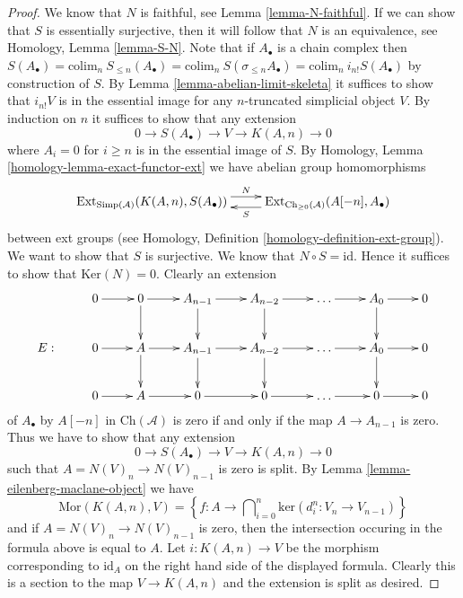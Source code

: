 \begin{proof}
\medskip\noindent
We know that $N$ is faithful, see Lemma \ref{lemma-N-faithful}.
If we can show that $S$ is essentially surjective, then
it will follow that $N$ is an equivalence,
see Homology, Lemma \ref{lemma-S-N}.
Note that if $A_\bullet$ is a chain complex
then $S(A_\bullet) = \text{colim}_n\ S_{\leq n}(A_\bullet)
= \text{colim}_n\ S(\sigma_{\leq n} A_\bullet) =
\text{colim}_n\ i_{n!} S(A_\bullet)$ by construction
of $S$.
By Lemma \ref{lemma-abelian-limit-skeleta} it suffices
to show that $i_{n!} V$ is in the essential image
for any $n$-truncated simplicial object $V$.
By induction on $n$ it suffices to show
that any extension
$$
0 \to S(A_\bullet) \to V \to K(A, n) \to 0
$$
where $A_i = 0$ for $i \geq n$ is in the essential
image of $S$. By Homology, Lemma \ref{homology-lemma-exact-functor-ext}
we have abelian group homomorphisms
$$
\xymatrix{
\text{Ext}_{\text{Simp}(\mathcal{A})}(K(A, n), S(A_\bullet))
\ar@<1ex>[r]^-{N} &
\text{Ext}_{\text{Ch}_{\geq 0}(\mathcal{A})}(A[-n], A_\bullet)
\ar@<1ex>[l]^-{S}
}
$$
between ext groups (see
Homology, Definition \ref{homology-definition-ext-group}).
We want to show that $S$ is surjective. We know that
$N \circ S = \text{id}$. Hence it suffices to show that
$\text{Ker}(N) = 0$. Clearly an extension
$$
\xymatrix{
&
0 \ar[r] &
0 \ar[r] \ar[d] &
A_{n - 1} \ar[r] \ar[d] &
A_{n - 2} \ar[r] \ar[d] &
\ldots \ar[r] &
A_0 \ar[r] \ar[d] &
0 \\
E : &
0 \ar[r] &
A \ar[r] \ar[d] &
A_{n - 1} \ar[r] \ar[d] &
A_{n - 2} \ar[r] \ar[d] &
\ldots \ar[r] &
A_0 \ar[r] \ar[d] &
0 \\
&
0 \ar[r] &
A \ar[r] &
0 \ar[r] &
0 \ar[r] &
\ldots \ar[r] &
0 \ar[r] &
0
}
$$
of $A_\bullet$ by $A[-n]$ in $\text{Ch}(\mathcal{A})$ is
zero if and only if the map $A \to A_{n - 1}$ is zero.
Thus we have to show that any extension
$$
0 \to S(A_\bullet) \to V \to K(A, n) \to 0
$$
such that $A = N(V)_n \to N(V)_{n - 1}$ is zero is split.
By Lemma \ref{lemma-eilenberg-maclane-object} we have
$$
\text{Mor}(K(A, n), V)
=
\left\{
f : A
\to
\bigcap\nolimits_{i = 0}^n \text{ker}(d^n_i : V_n \to V_{n - 1})
\right\}
$$
and if $A = N(V)_n \to N(V)_{n - 1}$ is zero, then
the intersection occuring in the formula above is
equal to $A$. Let $i : K(A, n) \to V$ be the morphism
corresponding to $\text{id}_A$ on the right hand side
of the displayed formula. Clearly this is a section
to the map $V \to K(A, n)$ and the extension is split
as desired.
\end{proof}







